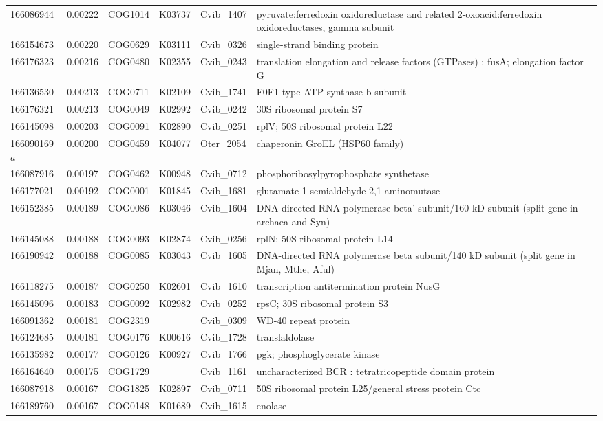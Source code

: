 \begin{landscape}
\begin{longtable}{p{1.6cm}p{1.2cm}p{1.5cm}p{1.5cm}p{2.8cm}p{13.5cm}}
166086944&0.00222&COG1014&K03737&Cvib\_1407&pyruvate:ferredoxin oxidoreductase and related 2-oxoacid:ferredoxin oxidoreductases, gamma subunit \\
166154673&0.00220&COG0629&K03111&Cvib\_0326&single-strand binding protein \\
166176323&0.00216&COG0480&K02355&Cvib\_0243&translation elongation and release factors (GTPases) : fusA; elongation factor G \\
166136530&0.00213&COG0711&K02109&Cvib\_1741&F0F1-type ATP synthase b subunit \\
166176321&0.00213&COG0049&K02992&Cvib\_0242&30S ribosomal protein S7 \\
166145098&0.00203&COG0091&K02890&Cvib\_0251&rplV; 50S ribosomal protein L22 \\
166090169$a$&0.00200&COG0459&K04077&Oter\_2054&chaperonin GroEL (HSP60 family) \\
166087916&0.00197&COG0462&K00948&Cvib\_0712&phosphoribosylpyrophosphate synthetase \\
166177021&0.00192&COG0001&K01845&Cvib\_1681&glutamate-1-semialdehyde 2,1-aminomutase \\
166152385&0.00189&COG0086&K03046&Cvib\_1604&DNA-directed RNA polymerase beta' subunit/160 kD subunit (split gene in archaea and Syn) \\
166145088&0.00188&COG0093&K02874&Cvib\_0256&rplN; 50S ribosomal protein L14 \\
166190942&0.00188&COG0085&K03043&Cvib\_1605&DNA-directed RNA polymerase beta subunit/140 kD subunit (split gene in Mjan, Mthe, Aful) \\
166118275&0.00187&COG0250&K02601&Cvib\_1610&transcription antitermination protein NusG \\
166145096&0.00183&COG0092&K02982&Cvib\_0252&rpsC; 30S ribosomal protein S3 \\
166091362&0.00181&COG2319&&Cvib\_0309&WD-40 repeat protein \\
166124685&0.00181&COG0176&K00616&Cvib\_1728&translaldolase \\
166135982&0.00177&COG0126&K00927&Cvib\_1766&pgk; phosphoglycerate kinase \\
166164640&0.00175&COG1729&&Cvib\_1161&uncharacterized BCR : tetratricopeptide domain protein \\
166087918&0.00167&COG1825&K02897&Cvib\_0711&50S ribosomal protein L25/general stress protein Ctc \\
166189760&0.00167&COG0148&K01689&Cvib\_1615&enolase \\

\end{longtable}
\end{landscape}
